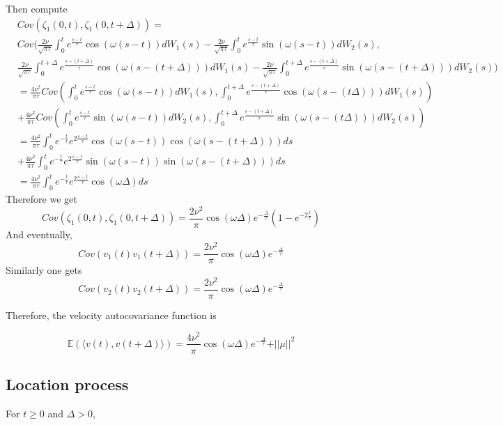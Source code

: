\documentclass[11pt]{article}
\newcommand {\1}{\mathbb{1}}
\begin{document}
Then compute
\begin{align*}
	&Cov(\zeta_1(0,t),\zeta_1(0,t+\Delta))=\\
	&Cov \bigg( \frac{2\nu}{\sqrt{\pi \tau}} \int_0^t e^{\frac{s-t}{\tau}} \cos(\omega(s-t)) dW_1(s) -\frac{2\nu}{\sqrt{\pi \tau}} \int_0^t e^{\frac{s-t}{\tau}} \sin(\omega(s-t)) dW_2(s), \\
	& \frac{2\nu}{\sqrt{\pi \tau}} \int_0^{t+\Delta} e^{\frac{s-(t+\Delta)}{\tau}} \cos(\omega(s-(t+\Delta))) dW_1(s) -\frac{2\nu}{\sqrt{\pi \tau}} \int_0^{t+\Delta} e^{\frac{s-(t+\Delta)}{\tau}} \sin(\omega(s-(t+\Delta))) dW_2(s)\bigg) \\
	&=
	\frac{4 \nu^2}{\pi \tau} Cov \left( \int_0^t e^{\frac{s-t}{\tau}} \cos(\omega(s-t)) dW_1(s), \int_0^{t+\Delta} e^{\frac{s-(t+\Delta)}{\tau}} \cos(\omega(s-(t\Delta))) dW_1(s) \right) \\
	&+ \frac{4 \nu^2}{\pi \tau} Cov \left( \int_0^t e^{\frac{s-t}{\tau}} \sin(\omega(s-t)) dW_2(s), \int_0^{t+\Delta} e^{\frac{s-(t+\Delta)}{\tau}} \sin(\omega(s-(t\Delta))) dW_2(s) \right) \\
	&= \frac{4\nu^2}{\pi \tau} \int_0^t e^{-\frac{t}{\tau}} e^{2 \frac{s-t}{\tau}} \cos(\omega(s-t)) \cos(\omega(s-(t+\Delta))) ds \\
	& + \frac{4\nu^2}{\pi \tau} \int_0^t e^{-\frac{t}{\tau}} e^{2 \frac{s-t}{\tau}} \sin(\omega(s-t)) \sin(\omega(s-(t+\Delta))) ds \\
	&= \frac{4\nu^2}{\pi \tau} \int_0^t e^{-\frac{t}{\tau}} e^{2 \frac{s-t}{\tau}} \cos(\omega \Delta) ds
\end{align*}
Therefore we get
\[
Cov(\zeta_1(0,t),\zeta_1(0,t+\Delta))=\frac{2\nu^2}{\pi} \cos(\omega \Delta) e^{-\frac{\Delta}{\tau}} (1-e^{-2\frac{t}{\tau}})
\]
And eventually, 
\[ Cov(v_1(t)v_1(t+\Delta))=\frac{2\nu^2}{\pi} \cos(\omega \Delta) e^{-\frac{\Delta}{\tau}}\]
Similarly one gets
\[ Cov(v_2(t)v_2(t+\Delta))=\frac{2\nu^2}{\pi} \cos(\omega \Delta) e^{-\frac{\Delta}{\tau}}\]

Therefore, the velocity autocovariance function is 

\begin{equation}
	\mathbb{E}(\langle v(t), v(t+\Delta) \rangle )=\frac{4\nu^2}{\pi} \cos(\omega \Delta) e^{-\frac{\Delta}{\tau}}+\vert \vert \mu \vert \vert^2
	\label{eq: RACVM autocovariance function}
\end{equation}

\subsection{Location process} \label{RACVM location process}
For $t \geq 0$ and $\Delta >0$,
\end{document}
